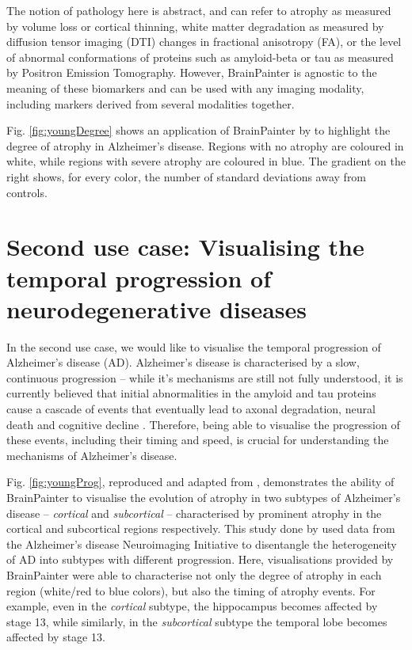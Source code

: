 \documentclass{llncs}
\begin{document}
The notion of pathology here is abstract, and can refer to atrophy as measured by volume loss or cortical thinning, white matter degradation as measured by diffusion tensor imaging (DTI) changes in fractional anisotropy (FA), or the level of abnormal conformations of proteins such as amyloid-beta or tau as measured by Positron Emission Tomography. However, BrainPainter is agnostic to the meaning of these biomarkers and can be used with any imaging modality, including markers derived from several modalities together. 

Fig. \ref{fig:youngDegree} shows an application of BrainPainter by \cite{young2018uncovering} to highlight the degree of atrophy in Alzheimer's disease. Regions with no atrophy are coloured in white, while regions with severe atrophy are coloured in blue. The gradient on the right shows, for every color, the number of standard deviations away from controls.


\section{Second use case: Visualising the temporal progression of neurodegenerative diseases}
\label{progression}

In the second use case, we would like to visualise the temporal progression of Alzheimer's disease (AD). Alzheimer's disease is characterised by a slow, continuous progression -- while it's mechanisms are still not fully understood, it is currently believed that initial abnormalities in the amyloid and tau proteins cause a cascade of events that eventually lead to axonal degradation, neural death and cognitive decline \cite{mudher2002alzheimer}. Therefore, being able to visualise the progression of these events, including their timing and speed, is crucial for understanding the mechanisms of Alzheimer's disease. 


Fig. \ref{fig:youngProg}, reproduced and adapted from \cite{young2018uncovering}, demonstrates the ability of BrainPainter to visualise the evolution of atrophy in two subtypes of Alzheimer's disease -- \emph{cortical} and \emph{subcortical} -- characterised by prominent atrophy in the cortical and subcortical regions respectively. This study done by \cite{young2018uncovering} used data from the Alzheimer's disease Neuroimaging Initiative to disentangle the heterogeneity of AD into subtypes with different progression. Here, visualisations provided by BrainPainter were able to characterise not only the degree of atrophy in each region (white/red to blue colors), but also the timing of atrophy events. For example, even in the \emph{cortical} subtype, the hippocampus becomes affected by stage 13, while similarly, in the \emph{subcortical} subtype the temporal lobe becomes affected by stage 13. 
\end{document}
